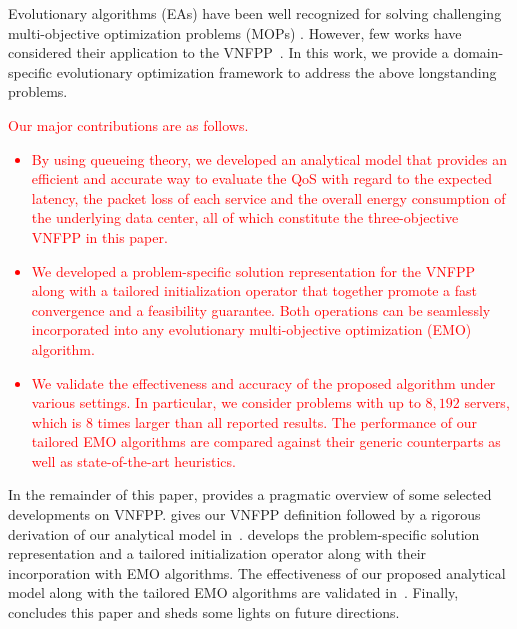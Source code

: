 Evolutionary algorithms (EAs) have been well recognized for solving challenging multi-objective optimization problems (MOPs) \cite{WangJ20,ZhouL17,WangWZ19,LiuLJ14}. However, few works have considered their application to the VNFPP~\cite{CaoZACHS16,RankothgeLRL17,LangeGZTJ17}. In this work, we provide a domain-specific evolutionary optimization framework to address the above longstanding problems. \textcolor{red}{Our major contributions are as follows.
\begin{itemize}
    \item By using queueing theory, we developed an analytical model that provides an efficient and accurate way to evaluate the QoS with regard to the expected latency, the packet loss of each service and the overall energy consumption of the underlying data center, all of which constitute the three-objective VNFPP in this paper.
    \item We developed a problem-specific solution representation for the VNFPP along with a tailored initialization operator that together promote a fast convergence and a feasibility guarantee. Both operations can be seamlessly incorporated into any evolutionary multi-objective optimization (EMO) algorithm.
    \item We validate the effectiveness and accuracy of the proposed algorithm under various settings. In particular, we consider problems with up to $8,192$ servers, which is $8$ times larger than all reported results. The performance of our tailored EMO algorithms are compared against their generic counterparts as well as state-of-the-art heuristics.
\end{itemize}
}

In the remainder of this paper,  provides a pragmatic overview of some selected developments on VNFPP.  gives our VNFPP definition followed by a rigorous derivation of our analytical model in~.  develops the problem-specific solution representation and a tailored initialization operator along with their incorporation with EMO algorithms. The effectiveness of our proposed analytical model along with the tailored EMO algorithms are validated in~. Finally,  concludes this paper and sheds some lights on future directions.
